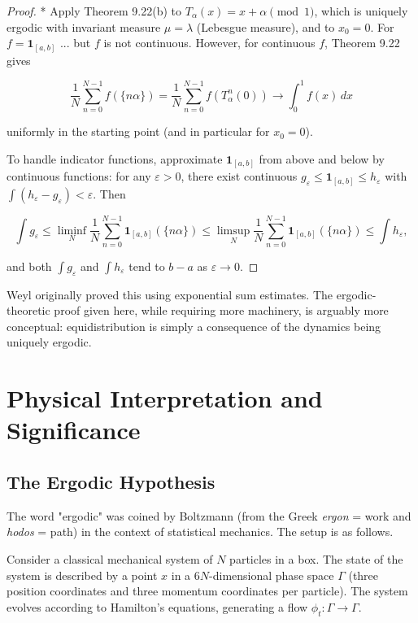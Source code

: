 \begin{proof}
* Apply Theorem 9.22(b) to $T_\alpha(x) = x + \alpha \pmod{1}$, which is uniquely ergodic with invariant measure $\mu = \lambda$ (Lebesgue measure), and to $x_0 = 0$. For $f = \mathbf{1}_{[a,b]}$ ... but $f$ is not continuous. However, for continuous $f$, Theorem 9.22 gives

\[
\frac{1}{N}\sum_{n=0}^{N-1} f(\{n\alpha\}) = \frac{1}{N}\sum_{n=0}^{N-1} f(T_\alpha^n(0)) \to \int_0^1 f(x) \, dx
\]

uniformly in the starting point (and in particular for $x_0 = 0$).

To handle indicator functions, approximate $\mathbf{1}_{[a,b]}$ from above and below by continuous functions: for any $\varepsilon > 0$, there exist continuous $g_\varepsilon \leq \mathbf{1}_{[a,b]} \leq h_\varepsilon$ with $\int (h_\varepsilon - g_\varepsilon) < \varepsilon$. Then

\[
\int g_\varepsilon \leq \liminf_{N} \frac{1}{N}\sum_{n=0}^{N-1} \mathbf{1}_{[a,b]}(\{n\alpha\}) \leq \limsup_N \frac{1}{N}\sum_{n=0}^{N-1} \mathbf{1}_{[a,b]}(\{n\alpha\}) \leq \int h_\varepsilon,
\]

and both $\int g_\varepsilon$ and $\int h_\varepsilon$ tend to $b - a$ as $\varepsilon \to 0$.
\end{proof}


\begin{remark}
Weyl originally proved this using exponential sum estimates. The ergodic-theoretic proof given here, while requiring more machinery, is arguably more conceptual: equidistribution is simply a consequence of the dynamics being uniquely ergodic.
\end{remark}


\section{Physical Interpretation and Significance}\label{sec:9.9}

\subsection{The Ergodic Hypothesis}\label{sec:9.9.1}

The word "ergodic" was coined by Boltzmann (from the Greek \textit{ergon} = work and \textit{hodos} = path) in the context of statistical mechanics. The setup is as follows.

Consider a classical mechanical system of $N$ particles in a box. The state of the system is described by a point $x$ in a $6N$-dimensional phase space $\Gamma$ (three position coordinates and three momentum coordinates per particle). The system evolves according to Hamilton's equations, generating a flow $\phi_t: \Gamma \to \Gamma$.

